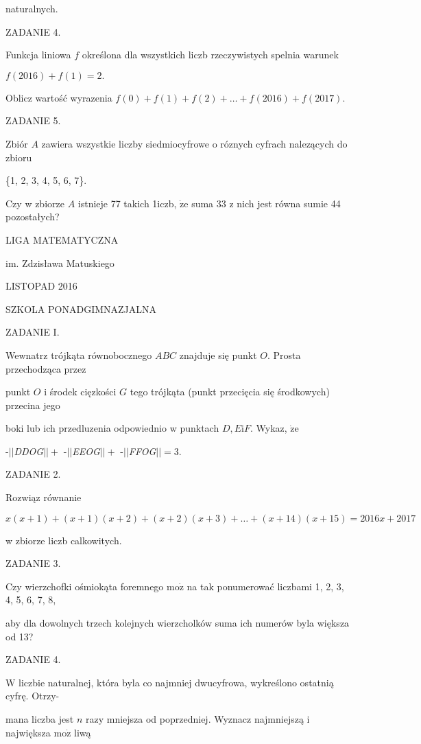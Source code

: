\documentclass[a4paper,12pt]{article}
\begin{document}
naturalnych.

ZADANIE 4.

Funkcja liniowa $f$ określona dla wszystkich liczb rzeczywistych spelnia warunek

$f(2016)+f(1)=2.$

Oblicz wartość wyrazenia $f(0)+f(1)+f(2)+\ldots+f(2016)+f(2017).$

ZADANIE 5.

Zbiór $A$ zawiera wszystkie liczby siedmiocyfrowe o róznych cyfrach nalezących do zbioru

\{1, 2, 3, 4, 5, 6, 7\}.

Czy w zbiorze $A$ istnieje 77 takich 1iczb, $\dot{\mathrm{z}}\mathrm{e}$ suma 33 z nich jest równa sumie 44 pozostałych?






LIGA MATEMATYCZNA

im. Zdzisława Matuskiego

LISTOPAD 2016

SZKOLA PONADGIMNAZJALNA

ZADANIE I.

Wewnatrz trójkąta równobocznego $ABC$ znajduje się punkt $O$. Prosta przechodząca przez

punkt $O$ i środek cięzkości $G$ tego trójkąta (punkt przecięcia się środkowych) przecina jego

boki lub ich przedluzenia odpowiednio w punktach $D, E\mathrm{i}F$. Wykaz, $\dot{\mathrm{z}}\mathrm{e}$

-$||${\it DDOG}$|| +$ -$||${\it EEOG}$|| +$ -$||${\it FFOG}$|| =$3.

ZADANIE 2.

Rozwiąz równanie

$x(x+1)+(x+1)(x+2)+(x+2)(x+3)+\ldots+(x+14)(x+15)=2016x+2017$

w zbiorze liczb calkowitych.

ZADANIE 3.

Czy wierzchofki ośmiokąta foremnego $\mathrm{m}\mathrm{o}\dot{\mathrm{z}}$ na tak ponumerować liczbami 1, 2, 3, 4, 5, 6, 7, 8,

aby dla dowolnych trzech kolejnych wierzcholków suma ich numerów byla większa od 13?

ZADANIE 4.

$\mathrm{W}$ liczbie naturalnej, która byla co najmniej dwucyfrowa, wykreślono ostatnią cyfrę. Otrzy-

mana liczba jest $n$ razy mniejsza od poprzedniej. Wyznacz najmniejszą i największa $\mathrm{m}\mathrm{o}\dot{\mathrm{z}}$ liwą
\end{document}
